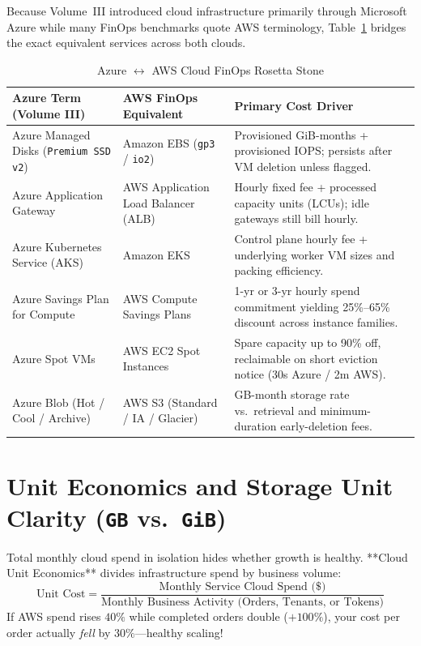 Because Volume~III introduced cloud infrastructure primarily through Microsoft Azure while many FinOps benchmarks quote AWS terminology, Table~\ref{tab:v5-ch08-rosetta} bridges the exact equivalent services across both clouds.

\begin{table}[htbp]
\centering\small
\begin{tabular}{llp{5.6cm}}
\toprule
\textbf{Azure Term (Volume III)} & \textbf{AWS FinOps Equivalent} & \textbf{Primary Cost Driver} \\
\midrule
Azure Managed Disks (\texttt{Premium SSD v2}) & Amazon EBS (\texttt{gp3} / \texttt{io2}) & Provisioned GiB-months + provisioned IOPS; persists after VM deletion unless flagged. \\
Azure Application Gateway & AWS Application Load Balancer (ALB) & Hourly fixed fee + processed capacity units (LCUs); idle gateways still bill hourly. \\
Azure Kubernetes Service (AKS) & Amazon EKS & Control plane hourly fee + underlying worker VM sizes and packing efficiency. \\
Azure Savings Plan for Compute & AWS Compute Savings Plans & 1-yr or 3-yr hourly spend commitment yielding 25\%--65\% discount across instance families. \\
Azure Spot VMs & AWS EC2 Spot Instances & Spare capacity up to 90\% off, reclaimable on short eviction notice (30s Azure / 2m AWS). \\
Azure Blob (Hot / Cool / Archive) & AWS S3 (Standard / IA / Glacier) & GB-month storage rate vs.\ retrieval and minimum-duration early-deletion fees. \\
\bottomrule
\end{tabular}
\caption{Azure $\leftrightarrow$ AWS Cloud FinOps Rosetta Stone}
\label{tab:v5-ch08-rosetta}
\end{table}

\section{Unit Economics and Storage Unit Clarity (\texttt{GB} vs.\ \texttt{GiB})}

Total monthly cloud spend in isolation hides whether growth is healthy. **Cloud Unit Economics** divides infrastructure spend by business volume:
\begin{equation}
\text{Unit Cost} = \frac{\text{Monthly Service Cloud Spend (\$)}}{\text{Monthly Business Activity (Orders, Tenants, or Tokens)}}
\end{equation}
If AWS spend rises $40\%$ while completed orders double ($+100\%$), your cost per order actually \emph{fell} by $30\%$---healthy scaling!

